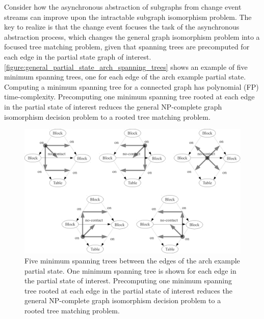 Consider how the asynchronous abstraction of subgraphs from change
event streams can improve upon the intractable subgraph isomorphism
problem.  The key to realize is that the change event focuses the task
of the asynchronous abstraction process, which changes the general
graph isomorphism problem into a focused tree matching problem, given
that spanning trees are precomputed for each edge in the partial state
graph of interest.
{\mbox{\autoref{figure:general_partial_state_arch_spanning_trees}}}
shows an example of five minimum spanning trees, one for each edge of
the arch example partial state.  Computing a minimum spanning tree for
a connected graph has polynomial (FP) time-complexity.  Precomputing
one minimum spanning tree rooted at each edge in the partial state of
interest reduces the general NP-complete graph isomorphism decision
problem to a rooted tree matching problem.
\begin{figure}
\centering
\includegraphics[width=12cm]{gfx/general_partial_state_arch_spanning_trees}
\caption[Five minimum spanning trees between the edges of the arch
  example partial state.]{Five minimum spanning trees between the
  edges of the arch example partial state.  One minimum spanning tree
  is shown for each edge in the partial state of interest.
  Precomputing one minimum spanning tree rooted at each edge in the
  partial state of interest reduces the general NP-complete graph
  isomorphism decision problem to a rooted tree matching problem.}
\label{figure:general_partial_state_arch_spanning_trees}
\end{figure}

